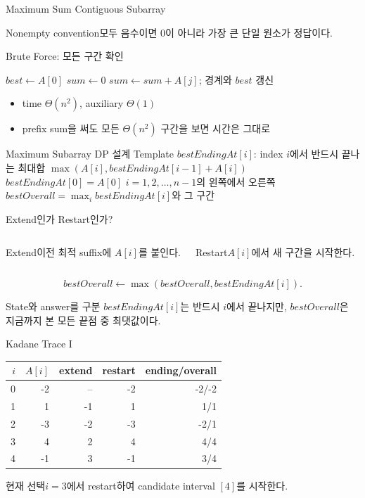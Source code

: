 \begin{frame}{Maximum Sum Contiguous Subarray}
\begin{alertblock}{Nonempty convention}모두 음수이면 0이 아니라 가장 큰 단일 원소가 정답이다.\end{alertblock}
\end{frame}
\begin{frame}{Brute Force: 모든 구간 확인}
\small\begin{algorithmic}[1]
\State $best\gets A[0]$
\State $sum\gets0$
\State $sum\gets sum+A[j]$; 경계와 $best$ 갱신
\EndFor\EndFor
\end{algorithmic}
\begin{itemize}\item time $\Theta(n^2)$, auxiliary $\Theta(1)$\item prefix sum을 써도 모든 $\Theta(n^2)$ 구간을 보면 시간은 그대로\end{itemize}
\end{frame}
\begin{frame}{Maximum Subarray DP 설계 Template}
\small
\dpdesign
{$bestEndingAt[i]$: index $i$에서 반드시 끝나는 최대합}
{$\max(A[i],bestEndingAt[i-1]+A[i])$}
{$bestEndingAt[0]=A[0]$}
{$i=1,2,\ldots,n-1$의 왼쪽에서 오른쪽}
{$bestOverall=\max_i bestEndingAt[i]$와 그 구간}
\end{frame}
\begin{frame}{Extend인가 Restart인가?}
\small
\begin{columns}[T]\begin{block}{Extend}이전 최적 suffix에 $A[i]$를 붙인다.\end{block}
\begin{block}{Restart}$A[i]$에서 새 구간을 시작한다.\end{block}\end{columns}
\[
bestOverall\gets\max(bestOverall,bestEndingAt[i]).
\]
\begin{alertblock}{State와 answer를 구분}
$bestEndingAt[i]$는 반드시 $i$에서 끝나지만, $bestOverall$은 지금까지 본 모든 끝점 중 최댓값이다.
\end{alertblock}
\end{frame}
\begin{frame}{Kadane Trace I}
\centering\scriptsize
\begin{tabular}{r|r|r|r|r}\toprule$i$&$A[i]$&extend&restart&ending/overall\\\midrule
0&-2&--&-2&-2/-2\\
1&1&-1&1&1/1\\
2&-3&-2&-3&-2/1\\
3&4&2&4&4/4\\
4&-1&3&-1&3/4\\\bottomrule
\end{tabular}
\begin{block}{현재 선택}$i=3$에서 restart하여 candidate interval $[4]$를 시작한다.\end{block}
\end{frame}
